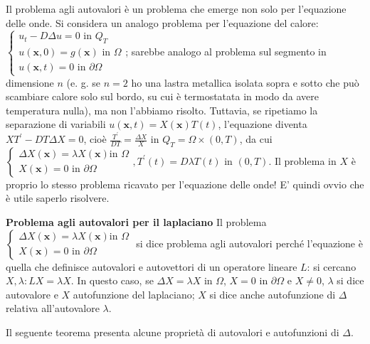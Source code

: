 \documentclass{article}
\begin{document}
Il problema agli autovalori \`{e} un problema che emerge non solo per
l'equazione delle onde. Si considera un analogo problema per l'equazione del
calore: $\left\{ 
\begin{array}{c}
u_{t}-D\Delta u=0\text{ in }Q_{T} \\ 
u\left( \mathbf{x},0\right) =g\left( \mathbf{x}\right) \text{ in }\Omega \\ 
u\left( \mathbf{x},t\right) =0\text{ in }\partial \Omega%
\end{array}%
\right. $; sarebbe analogo al problema sul segmento in dimensione $n$ (e. g.
se $n=2$ ho una lastra metallica isolata sopra e sotto che pu\`{o} scambiare
calore solo sul bordo, su cui \`{e} termostatata in modo da avere
temperatura nulla), ma non l'abbiamo risolto. Tuttavia, se ripetiamo la
separazione di variabili $u\left( \mathbf{x},t\right) =X\left( \mathbf{x}%
\right) T\left( t\right) $, l'equazione diventa $XT^{\prime }-DT\Delta X=0$,
cio\`{e} $\frac{T^{\prime }}{DT}=\frac{\Delta X}{X}$ in $Q_{T}=\Omega \times
\left( 0,T\right) $, da cui $\left\{ 
\begin{array}{c}
\Delta X\left( \mathbf{x}\right) =\lambda X\left( \mathbf{x}\right) \text{
in }\Omega \\ 
X\left( \mathbf{x}\right) =0\text{ in }\partial \Omega%
\end{array}%
\right. ,T^{\prime }\left( t\right) =D\lambda T\left( t\right) $ in $\left(
0,T\right) $. Il problema in $X$ \`{e} proprio lo stesso problema ricavato
per l'equazione delle onde! E' quindi ovvio che \`{e} utile saperlo
risolvere.

\textbf{Problema agli autovalori per il laplaciano} Il problema $\left\{ 
\begin{array}{c}
\Delta X\left( \mathbf{x}\right) =\lambda X\left( \mathbf{x}\right) \text{
in }\Omega \\ 
X\left( \mathbf{x}\right) =0\text{ in }\partial \Omega%
\end{array}%
\right. $ si dice problema agli autovalori perch\'{e} l'equazione \`{e}
quella che definisce autovalori e autovettori di un operatore lineare $L$:
si cercano $X,\lambda :LX=\lambda X$. In questo caso, se $\Delta X=\lambda X$
in $\Omega $, $X=0$ in $\partial \Omega $ e $X\neq 0$, $\lambda $ si dice
autovalore e $X$ autofunzione del laplaciano; $X$ si dice anche autofunzione
di $\Delta $ relativa all'autovalore $\lambda $.

Il seguente teorema presenta alcune propriet\`{a} di autovalori e
autofunzioni di $\Delta $.
\end{document}
